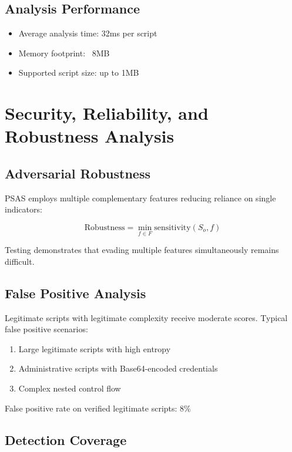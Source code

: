 \documentclass[10pt,conference,a4paper]{IEEEtran}
\begin{document}
\subsection{Analysis Performance}

\begin{itemize}
\item Average analysis time: 32ms per script
\item Memory footprint: ~8MB
\item Supported script size: up to 1MB
\end{itemize}

\section{Security, Reliability, and Robustness Analysis}

\subsection{Adversarial Robustness}

PSAS employs multiple complementary features reducing reliance on single indicators:

\begin{equation}
\text{Robustness} = \min_{f \in F} \text{sensitivity}(S_o, f)
\label{eq:robustness}
\end{equation}

Testing demonstrates that evading multiple features simultaneously remains difficult.

\subsection{False Positive Analysis}

Legitimate scripts with legitimate complexity receive moderate scores. Typical false positive scenarios:

\begin{enumerate}
\item Large legitimate scripts with high entropy
\item Administrative scripts with Base64-encoded credentials
\item Complex nested control flow
\end{enumerate}

False positive rate on verified legitimate scripts: 8\%

\subsection{Detection Coverage}
\end{document}
